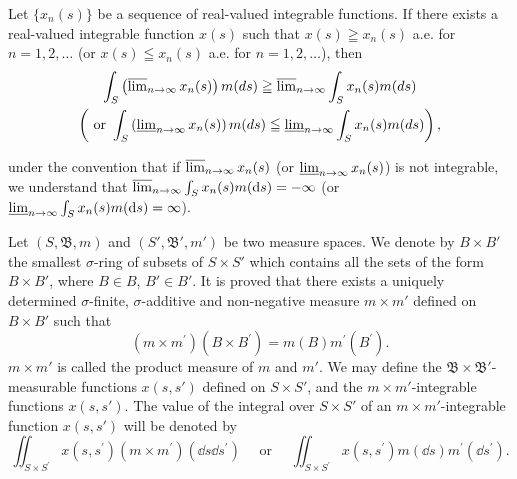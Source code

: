 \begin{lemman} Let $\{x_{n}(s)\}$ be a sequence of real-valued integrable functions. If there exists a real-valued integrable function $x(s)$ such that $x(s) \geqq x_{n}(s)$ a.e. for $n = 1, 2, \ldots$ (or $x(s) \leqq x_{n}(s)$ a.e. for $n = 1, 2, \ldots$), then 
\begin{gather*}\int_{S} \left(\varlimsup\limits_{n \rightarrow \infty} x _{n} (s)\right) m(d s) \geqq \varlimsup\limits_{n \rightarrow \infty} \int_{S} x _{n} (s) m(d s) \\\left(\text{ or } \int_{S} \left(\varliminf\limits_{n \to \infty} x _{n} (s)\right) m(d s) \leqq \varliminf\limits_{n \to \infty} \int_{S} x _{n} (s) m(d s)\right), 
\end{gather*}

under the convention that if $\varlimsup\limits_{n\to\infty}x_n(s)$ (or $\varliminf\limits_{n\to\infty}x_n(s)$) is not integrable, we understand that $\varlimsup\limits_{n\to\infty}\int_{S}x_n(s)m(\dd s)=-\infty$ (or $\varliminf\limits_{n\to\infty}\int_{S}x_n(s)m(\dd s)=\infty$). 
\end{lemman}

\begin{definitionu} Let $(S, \mathfrak{B}, m)$ and $(S', \mathfrak{B}', m')$ be two measure spaces. We denote by $B \times B'$ the smallest $\sigma$-ring of subsets of $S \times S'$ which contains all the sets of the form $B \times B'$, where $B \in B$, $B' \in B'$. It is proved that there exists a uniquely determined $\sigma$-finite, $\sigma$-additive and non-negative measure $m \times m'$ defined on $B \times B'$ such that 
\[
(m \times m ^{\prime}) (B \times B ^{\prime}) = m(B) m ^{\prime} (B ^{\prime}).
\]
$m \times m'$ is called the product measure of $m$ and $m'$. We may define the $\mathfrak{B} \times \mathfrak{B}'$-measurable functions $x(s, s')$ defined on $S \times S'$, and the $m \times m'$-integrable functions $x(s, s')$. The value of the integral over $S \times S'$ of an $m \times m'$-integrable function $x(s, s')$ will be denoted by 
\[
\iint_ {S \times S ^{\prime}} x (s, s ^{\prime}) (m \times m ^{\prime}) (\dd s \dd s ^{\prime}) \quad \text{ or } \quad \iint_ {S \times S ^{\prime}} x (s, s ^{\prime}) m(\dd s) m ^{\prime} (\dd s ^{\prime}).
\]
\end{definitionu}

